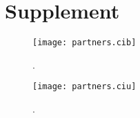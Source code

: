 \section{Supplement}

\begin{figure}
  \texttt{[image: partners.cib]}
  \caption{\pfigcap. }
  \label{fig:partners.cib}
\end{figure}
\begin{figure}
  \texttt{[image: partners.ciu]}
  \caption{\pfigcap. }
  \label{fig:partners.ciu}
\end{figure}